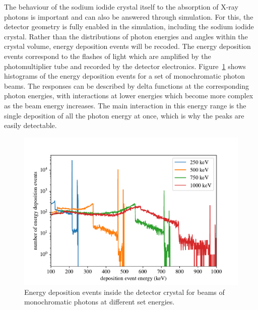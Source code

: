 The behaviour of the sodium iodide crystal itself to the absorption of X-ray photons is important and can also be answered through simulation. For this, the detector geometry is fully enabled in the simulation, including the sodium iodide crystal. Rather than the distributions of photon energies and angles within the crystal volume, energy deposition events will be recoded. The energy deposition events correspond to the flashes of light which are amplified by the photomultiplier tube and recorded by the detector electronics. Figure~\ref{detector_energy_response} shows histograms of the energy deposition events for a set of monochromatic photon beams. The responses can be described by delta functions at the corresponding photon energies, with interactions at lower energies which become more complex as the beam energy increases. The main interaction in this energy range is the single deposition of all the photon energy at once, which is why the peaks are easily detectable. 

\begin{figure}[p]
\label{detector_energy_response}
\includegraphics[width=\textwidth]{figures/chapter_3/detector_energy_response/detector_energy_response}
\caption{Energy deposition events inside the detector crystal for beams of monochromatic photons at different set energies. }
\end{figure}


 





